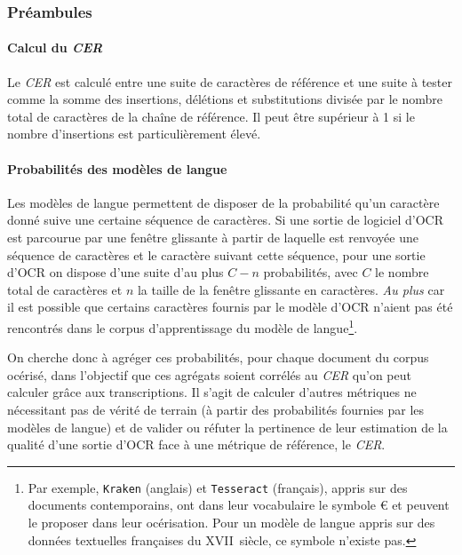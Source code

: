 \documentclass[10pt,twoside]{article}
\begin{document}
    	\subsubsection{Préambules} 

	    	\paragraph{Calcul du \textit{CER}}
	    	Le \textit{CER} est calculé entre une suite de caractères de référence et une suite à tester comme la somme des 
	        insertions, délétions et substitutions divisée par le nombre total de caractères de la chaîne de référence. 
	        Il peut être supérieur à 1 si le nombre d'insertions est particulièrement élevé.

	        \paragraph{Probabilités des modèles de langue}\label{probaLM}
			Les modèles de langue permettent de disposer de la probabilité qu'un caractère donné suive une certaine séquence de 
		    caractères. Si une sortie de logiciel d'OCR est parcourue par une fenêtre glissante à partir de laquelle est renvoyée une
		    séquence de caractères et le caractère suivant cette séquence, pour une sortie d'OCR on dispose d'une suite d'au plus
		    $C - n$ probabilités, avec $C$ le nombre total de caractères et $n$ la taille de la fenêtre glissante en caractères.
		    \textit{Au plus} car il est possible que certains caractères fournis par le modèle d'OCR n'aient pas été rencontrés
		    dans le corpus d'apprentissage du modèle de langue\footnote{Par exemple,  \verb!Kraken! (anglais) et 
		    \verb!Tesseract! (français), appris sur des documents contemporains, ont dans leur vocabulaire le symbole \euro{} et peuvent le proposer
		    dans leur océrisation. Pour un modèle de langue appris sur des données textuelles françaises du XVII\ieme~siècle,
		    ce symbole n'existe pas.}. 

	    	On cherche donc à agréger ces probabilités, pour chaque document du corpus océrisé, dans l'objectif que ces agrégats
	    	soient corrélés au \textit{CER} qu'on peut calculer grâce aux transcriptions. Il s'agit de calculer d'autres métriques
	    	ne nécessitant pas de vérité de terrain (à partir des probabilités fournies par les modèles de langue) et de valider ou
	    	réfuter la pertinence de leur estimation de la qualité d'une sortie d'OCR face à une métrique de référence, le \textit{CER}.
\end{document}
